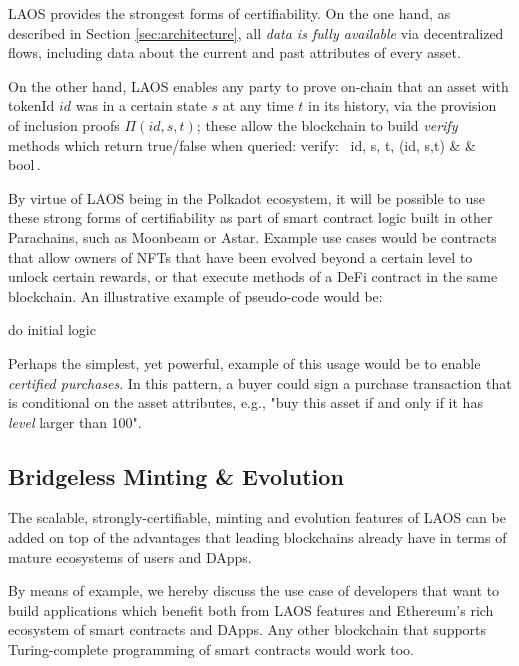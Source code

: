 LAOS provides the strongest forms of certifiability. On the one hand,
as described in Section \ref{sec:architecture}, all {\it data is fully available}
via decentralized flows, including data about the current and
past attributes of every asset.

On the other hand, LAOS enables any party to prove on-chain that an asset
with tokenId $id$ was in a certain state $s$ at any time $t$ in its history,
via the provision
of inclusion proofs $\Pi(id, s,t)$; these allow the blockchain to build {\it verify} 
methods which return true/false when queried:
\bea
\mbox{verify: \espai} id, s, t, \Pi(id, s,t) & \rightarrow & \mbox{bool}\,.
\eea

By virtue of LAOS being in the Polkadot ecosystem, it will be possible
to use these strong forms of certifiability as part of smart contract logic
built in other Parachains, such as Moonbeam\cite{moonbeam} or Astar\cite{astar}.
Example use cases would be contracts that allow owners of 
NFTs that have been evolved beyond a certain level to unlock certain rewards,
or that execute methods of a DeFi contract in the same blockchain.
An illustrative example of pseudo-code would be:
\begin{algorithm}[H]
    do initial logic\;
\end{algorithm}

Perhaps the simplest, yet powerful, example of this usage would be to enable {\it certified purchases}.
In this pattern, a buyer could sign a purchase transaction that is conditional on the asset
attributes, e.g., "buy this asset if and only if it has {\it level} larger than 100".

\subsection{Bridgeless Minting \& Evolution}\label{sec:la-bridglessness}

The scalable, strongly-certifiable, minting and evolution features of LAOS
can be added on top of the advantages that leading blockchains already
have in terms of mature ecosystems of users and DApps.

By means of example, we hereby discuss the use case of developers that
want to build applications which benefit both from LAOS features and
Ethereum's rich ecosystem of smart contracts and DApps.
Any other blockchain that supports Turing-complete
programming of smart contracts would work too. 

